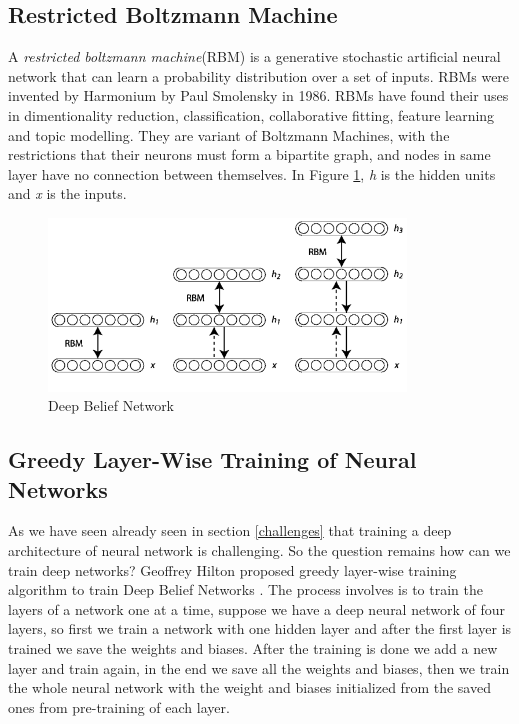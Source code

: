 \documentclass[12pt, a4paper]{report}
\begin{document}
\subsection{Restricted Boltzmann Machine}\label{sec:RBM}

A \textit{restricted boltzmann machine}(RBM) is a generative stochastic artificial neural network that can learn a probability distribution over a set of inputs. RBMs were invented by Harmonium by Paul Smolensky in 1986\cite{RBM}. RBMs have found their uses in dimentionality reduction, classification, collaborative fitting, feature learning and topic modelling\cite{RBMuses}. They are variant of Boltzmann Machines, with the restrictions that their neurons must form a bipartite graph, and nodes in same layer have no connection between themselves. In Figure \ref{fig:RBM}, \textit{h} is the hidden units and \textit{x} is the inputs.\\ \par

\begin{figure}[h]
\centering
\includegraphics[width=9.5cm]{DBN.png}
\caption{Deep Belief Network}
\label{fig:RBM}
\end{figure}

\subsection{Greedy Layer-Wise Training of Neural Networks}\label{greedy}
As we have seen already seen in section \ref{challenges} that training a deep architecture of neural network is challenging. So the question remains how can we train deep networks? Geoffrey Hilton proposed greedy layer-wise training algorithm to train Deep Belief Networks \cite{Greedy}. The process involves is to train the layers of a network one at a time, suppose we have a deep neural network of four layers, so first we train a network with one hidden layer and after the first layer is trained we save the weights and biases. After the training is done we add a new layer and train again, in the end we save all the weights and biases, then we train the whole neural network with the weight and biases initialized from the saved ones from pre-training of each layer.\\ \par
\end{document}

